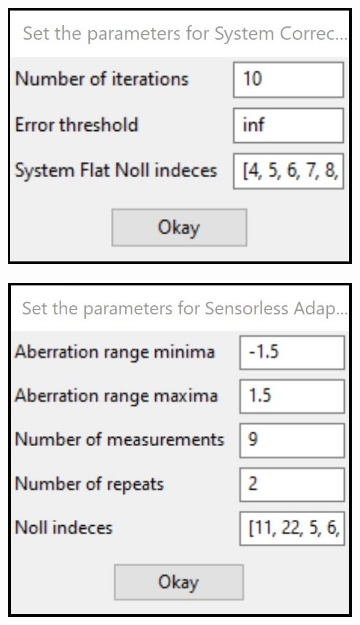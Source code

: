 \begin{figure}[H]
	\begin{subfigure}{0.45\textwidth}
		\centering
		\includegraphics[width=\linewidth]{images/direct_wavefront_sensing_options.jpg}
		\caption{}
		\label{fig:DM_direct_wavefront_sensing_options}
	\end{subfigure}
	\begin{subfigure}{0.35\textwidth}
		\centering
		\includegraphics[width=\linewidth]{images/sensorless_ao_parameters.jpg}
		\caption{}
		\label{fig:DM_sensorless_ao_parameters}

\end{subfigure}
\end{figure}
